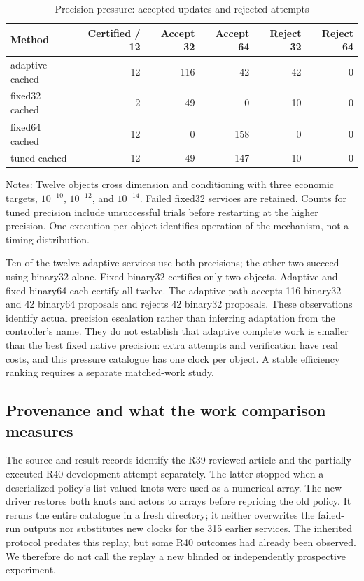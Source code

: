\begin{table}[htbp]\centering\small
\caption{Precision pressure: accepted updates and rejected attempts}\label{tab:r41precision}
\begin{tabular}{lrrrrr}\toprule
Method & Certified / 12 & Accept 32 & Accept 64 & Reject 32 & Reject 64\\\midrule
adaptive cached & 12 & 116 & 42 & 42 & 0\\
fixed32 cached & 2 & 49 & 0 & 10 & 0\\
fixed64 cached & 12 & 0 & 158 & 0 & 0\\
tuned cached & 12 & 49 & 147 & 10 & 0\\
\bottomrule\end{tabular}
\par\smallskip\begin{minipage}{.97\textwidth}\footnotesize Notes: Twelve objects cross dimension and conditioning with three economic targets, $10^{-10}$, $10^{-12}$, and $10^{-14}$. Failed fixed32 services are retained. Counts for tuned precision include unsuccessful trials before restarting at the higher precision. One execution per object identifies operation of the mechanism, not a timing distribution.\end{minipage}\end{table}

Ten of the twelve adaptive services use both precisions; the other two
succeed using binary32 alone. Fixed binary32 certifies only two objects.
Adaptive and fixed binary64 each certify all twelve. The adaptive path
accepts 116 binary32 and 42 binary64 proposals and rejects 42 binary32
proposals. These observations identify actual precision escalation rather
than inferring adaptation from the controller's name. They do not establish
that adaptive complete work is smaller than the best fixed native precision:
extra attempts and verification have real costs, and this pressure catalogue
has one clock per object. A stable efficiency ranking requires a separate
matched-work study.

\subsection{Provenance and what the work comparison measures}
The source-and-result records identify the R39 reviewed article and the
partially executed R40 development attempt separately. The latter stopped
when a deserialized policy's list-valued knots were used as a numerical
array. The new driver restores both knots and actors to arrays before
repricing the old policy. It reruns the entire catalogue in a fresh directory;
it neither overwrites the failed-run outputs nor substitutes new clocks
for the 315 earlier services. The inherited protocol predates this replay,
but some R40 outcomes had already been observed. We therefore do not call
the replay a new blinded or independently prospective experiment.

